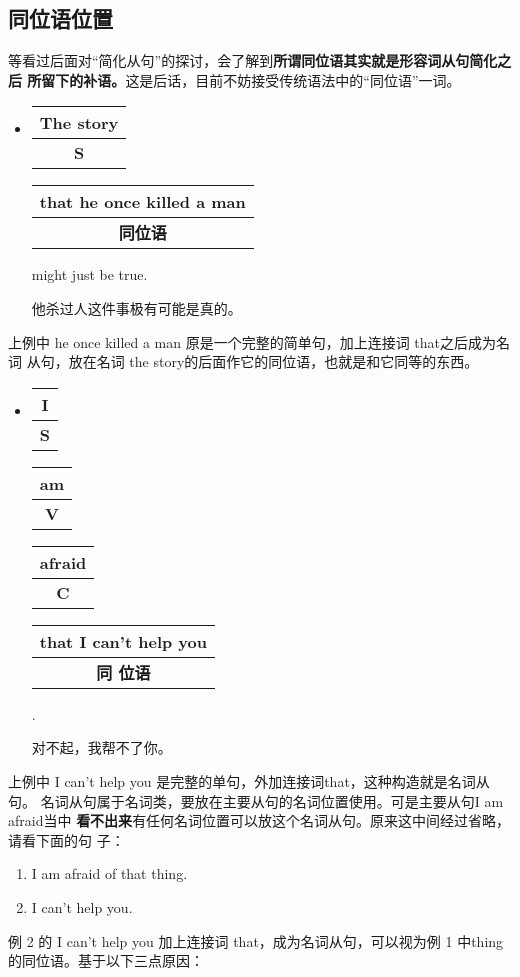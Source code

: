 \documentclass{yufa}
\makeatletter
\newcommand\unct[2]{\def\arraystretch{0.8}
  {\setlength{\tabcolsep}{0pt}
    \begin{tabular}[t]{@{}c@{}} \setlength\arrayrulewidth{0.8pt} \textbf{#1}\\\hline \textbf{\small #2} \\\end{tabular}}}
\makeatother
\begin{document}
\subsection{同位语位置}

等看过后面对“简化从句”的探讨，会了解到\textbf{所谓同位语其实就是形容词从句简化之后
所留下的补语。}这是后话，目前不妨接受传统语法中的“同位语”一词。

\begin{itemize}
\item \unct{The story}{S} \unct{that he once killed a man}{同位语} might just
  be true.

  他杀过人这件事极有可能是真的。
\end{itemize}
上例中 he once killed a man 原是一个完整的简单句，加上连接词 that之后成为名词
从句，放在名词 the story的后面作它的同位语，也就是和它同等的东西。

\begin{itemize}
\item \unct{I}{S} \unct{am}{V} \unct{afraid}{C} \unct{that I can't help you}{同
    位语}.

  对不起，我帮不了你。
\end{itemize}
上例中 I can't help you 是完整的单句，外加连接词that，这种构造就是名词从句。
名词从句属于名词类，要放在主要从句的名词位置使用。可是主要从句I am afraid当中
\textbf{看不出来}有任何名词位置可以放这个名词从句。原来这中间经过省略，请看下面的句
子：
\begin{enumerate}
\item I am afraid of that thing.
\item I can't help you.
\end{enumerate}
例 2 的 I can't help you 加上连接词 that，成为名词从句，可以视为例 1 中thing
的同位语。基于以下三点原因：
\end{document}
